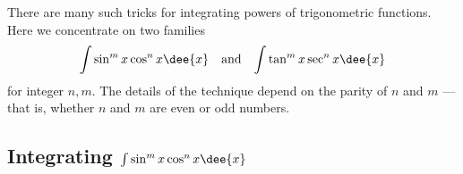 
There are many such tricks for integrating powers of trigonometric functions. Here we
concentrate on two families
\begin{align*}
  \int \sin^mx \cos^nx \dee{x} &&\text{and}&&
  \int \tan^mx \sec^nx \dee{x}
\end{align*}
for integer $n,m$. The details of the technique depend on the parity of $n$ and $m$ ---
that is, whether $n$ and $m$ are even or odd numbers.
\subsection{Integrating $\int \sin^m x\cos^n x\dee{x}$}\label{sec:sincos}
